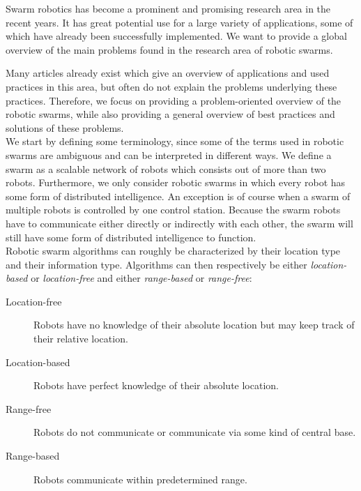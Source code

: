 
Swarm robotics has become a prominent and promising research area in the recent years. 
It has great potential use for a large variety of applications, some of which have already been successfully implemented. 
We want to provide a global overview of the main problems found in the research area of robotic swarms. 

Many articles already exist which give an overview of applications and used practices in this area, but often do not explain the problems underlying these practices. 
Therefore, we focus on providing a problem-oriented overview of the robotic swarms, while also providing a general overview of best practices and solutions of these problems.\\

We start by defining some terminology, since some of the terms used in robotic swarms are ambiguous and can be interpreted in different ways.
We define a swarm as a scalable network of robots which consists out of more than two robots.
Furthermore, we only consider robotic swarms in which every robot has some form of distributed intelligence.
An exception is of course when a swarm of multiple robots is controlled by one control station.
Because the swarm robots have to communicate either directly or indirectly with each other, the swarm will still have some form of distributed intelligence to function.
\\
Robotic swarm algorithms can roughly be characterized by their location type and their information type. Algorithms can then respectively be either \emph{location-based} or \emph{location-free} and either \emph{range-based} or \emph{range-free}:
\begin{description}
	\item[Location-free] Robots have no knowledge of their absolute location but may keep track of their relative location.
	\item[Location-based] Robots have perfect knowledge of their absolute location.
	\item[Range-free] Robots do not communicate or communicate via some kind of central base.
	\item[Range-based] Robots communicate within predetermined range.
\end{description}

